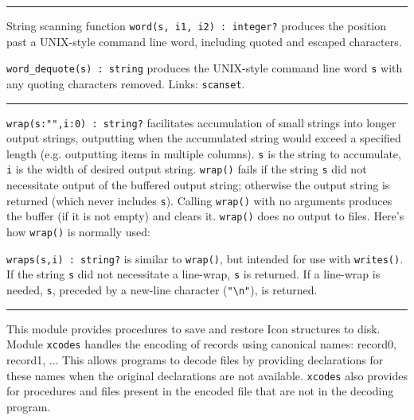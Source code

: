 \vspace{0.25cm}\hrule{}

String scanning function \texttt{word(s, i1, i2) : integer?} produces
the position past a UNIX-style command line word, including quoted and
escaped characters.

\texttt{word\_dequote(s) : string} produces the UNIX-style command line
word \texttt{s} with any quoting characters removed.
Links: \texttt{scanset}.

\vspace{0.25cm}\hrule{}

\texttt{wrap}\texttt{(s:"",i:0)
: string?} facilitates accumulation of small strings into longer output
strings, outputting when the accumulated string would exceed a
specified length (e.g. outputting items in multiple columns).
\texttt{s} is the string to accumulate, \texttt{i} is the width of
desired output string. \texttt{wrap()} fails if the string \texttt{s}
did not necessitate output of the buffered output string; otherwise the
output string is returned (which never includes \texttt{s}). Calling
\texttt{wrap()} with no arguments produces the buffer (if it is not
empty) and clears it. \texttt{wrap()} does no output to files.
Here's how \texttt{wrap()} is normally used:


\texttt{wraps(s,i) : string?} is similar to \texttt{wrap()}, but
intended for use with \texttt{writes()}. If the string \texttt{s} did
not necessitate a line-wrap, \texttt{s} is returned. If a line-wrap is
needed, \texttt{s}, preceded by a new-line character
(\texttt{"{\textbackslash}n"}), is
returned.

\vspace{0.25cm}\hrule{}

This module provides procedures to save and restore Icon structures to
disk. Module \texttt{xcodes} handles the encoding of
records using canonical names: record0, record1, ... This allows
programs to decode files by providing declarations for these names when
the original declarations are not available. \texttt{xcodes} also
provides for procedures and files present in the encoded file that are
not in the decoding program.

